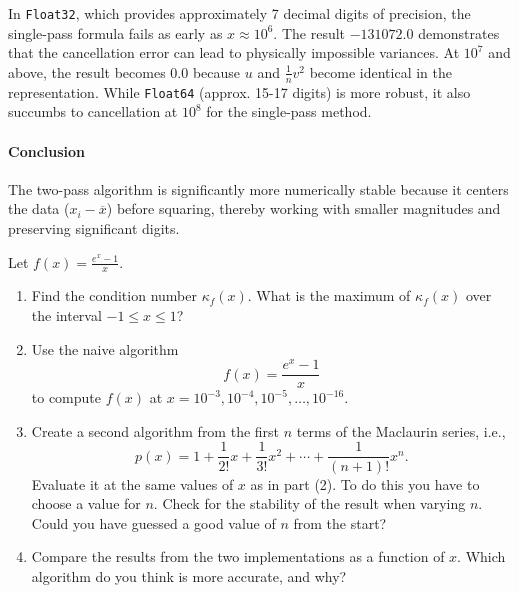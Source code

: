 \begin{solution}
	In \texttt{Float32}, which provides approximately 7 decimal digits of
	precision, the single-pass formula fails as early as $x \approx 10^6$. The
	result $-131072.0$ demonstrates that the cancellation error can lead to
	physically impossible variances. At $10^7$ and above, the result becomes $0.0$
	because $u$ and $\frac{1}{n}v^2$ become identical in the representation. While
	\texttt{Float64} (approx. 15-17 digits) is more robust, it also succumbs to
	cancellation at $10^8$ for the single-pass method.

	\paragraph{Conclusion}
	The two-pass algorithm is significantly more numerically stable
	because it centers the data ($x_i - \overline{x}$) before squaring, thereby
	working with smaller magnitudes and preserving significant digits.
\end{solution}

\begin{exercise}
	Let \(f(x) = \frac{e^x-1}{x}\).
	\begin{enumerate}
		\item Find the condition number $\kappa_f(x)$. What is the maximum of
		      $\kappa_f(x)$ over the interval \(-1\le x \le 1\)?
		\item Use the naive algorithm
		      \[
			      f(x)= \frac{e^{x}-1}{x}
		      \]
		      to compute \(f(x)\) at \(x=10^{-3},10^{-4},10^{-5},\ldots,10^{-16}\).
		\item Create a second algorithm from the first $n$ terms of the Maclaurin
		      series, i.e.,
		      \[
			      p(x) = 1 + \frac{1}{2!}x + \frac{1}{3!}x^2 + \cdots + \frac{1}{(n+1)!}x^n.
		      \]
		      Evaluate it at the same values of $x$ as in part (2). To do this you
		      have to choose a value for $n$. Check for the stability of the result when
		      varying $n$. Could you have guessed a good value of $n$ from the start?
		\item Compare the results from the two implementations as a function of $x$.
		      Which algorithm do you think is more accurate, and why?
	\end{enumerate}
\end{exercise}


